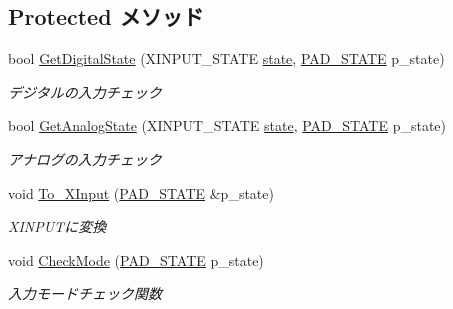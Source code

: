 \subsection*{Protected メソッド}
\begin{DoxyCompactItemize}
\item 
bool \hyperlink{class_controller_a21ee0719e227bc36b080aa4f2e229812}{Get\-Digital\-State} (X\-I\-N\-P\-U\-T\-\_\-\-S\-T\-A\-T\-E \hyperlink{_main_8cpp_a48e2c0184734db6ef7077da8cdb059df}{state}, \hyperlink{class_controller_a5bae253bd639d029d58ea618fafc5299}{P\-A\-D\-\_\-\-S\-T\-A\-T\-E} p\-\_\-state)
\begin{DoxyCompactList}\small\item\em デジタルの入力チェック \end{DoxyCompactList}\item 
bool \hyperlink{class_controller_a62f7167d65f638f68e85b08c588f9962}{Get\-Analog\-State} (X\-I\-N\-P\-U\-T\-\_\-\-S\-T\-A\-T\-E \hyperlink{_main_8cpp_a48e2c0184734db6ef7077da8cdb059df}{state}, \hyperlink{class_controller_a5bae253bd639d029d58ea618fafc5299}{P\-A\-D\-\_\-\-S\-T\-A\-T\-E} p\-\_\-state)
\begin{DoxyCompactList}\small\item\em アナログの入力チェック \end{DoxyCompactList}\item 
void \hyperlink{class_controller_ae275d483d8a2a330cbe04e3dca500156}{To\-\_\-\-X\-Input} (\hyperlink{class_controller_a5bae253bd639d029d58ea618fafc5299}{P\-A\-D\-\_\-\-S\-T\-A\-T\-E} \&p\-\_\-state)
\begin{DoxyCompactList}\small\item\em X\-I\-N\-P\-U\-Tに変換 \end{DoxyCompactList}\item 
void \hyperlink{class_controller_a86ff3e3e05fa2b175268b09c109f1dfe}{Check\-Mode} (\hyperlink{class_controller_a5bae253bd639d029d58ea618fafc5299}{P\-A\-D\-\_\-\-S\-T\-A\-T\-E} p\-\_\-state)
\begin{DoxyCompactList}\small\item\em 入力モードチェック関数 \end{DoxyCompactList}\end{DoxyCompactItemize}
